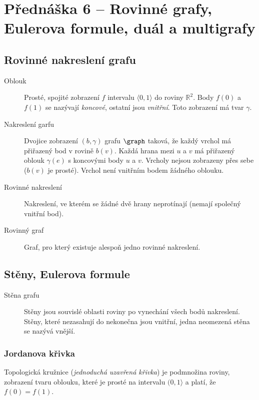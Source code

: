 \section{Přednáška 6 -- Rovinné grafy, Eulerova formule, duál a multigrafy}

\subsection{Rovinné nakreslení grafu}

\begin{description}
    \item[Oblouk] Prosté, spojité zobrazení $f$ intervalu \(\langle 0, 1 \rangle\) do roviny $\mathbb{R}^2$.
    Body $f(0)$ a $f(1)$ se nazývají \textit{koncové}, ostatní jsou \textit{vnitřní}.
    Toto zobrazení má tvar $\gamma$.
    \item[Nakreslení garfu] Dvojice zobrazení $(b, \gamma)$ grafu $\graph$ taková, že každý vrchol má přiřazený bod v rovině $b(v)$.
    Každá hrana mezi $u$ a $v$ má přiřazený oblouk $\gamma(e)$ s koncovými body $u$ a $v$.
    Vrcholy nejsou zobrazeny přes sebe ($b(v)$ je prosté).
    Vrchol není vnitřním bodem žádného oblouku.
    \item[Rovinné nakreslení] Nakreslení, ve kterém se žádné dvě hrany neprotínají (nemají společný vnitřní bod).
    \item[Rovinný graf] Graf, pro který existuje alespoň jedno rovinné nakreslení.
\end{description}

\subsection{Stěny, Eulerova formule}

\begin{description}
    \item[Stěna grafu] Stěny jsou souvislé oblasti roviny po vynechání všech bodů nakreslení.
    Stěny, které nezasahují do nekonečna jsou vnitřní, jedna neomezená stěna se nazývá vnější.
\end{description}

\subsubsection{Jordanova křivka}

Topologická kružnice (\textit{jednoduchá uzavřená křivka}) je podmnožina roviny, zobrazení tvaru oblouku, které je prosté na intervalu $(0, 1\rangle$ a platí, že $f(0) = f(1)$.

